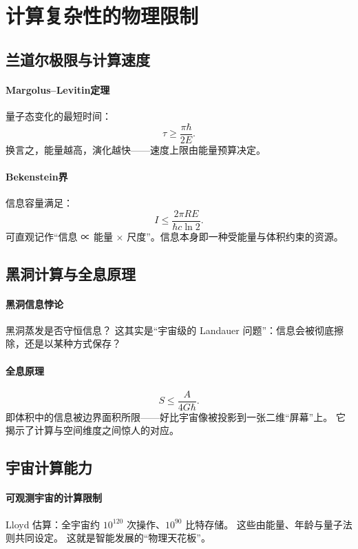 \section{计算复杂性的物理限制}

\subsection{兰道尔极限与计算速度}

\paragraph{Margolus–Levitin定理}
量子态变化的最短时间：
$$\tau\ge\dfrac{\pi\hbar}{2E}.$$
换言之，能量越高，演化越快——速度上限由能量预算决定。

\paragraph{Bekenstein界}
信息容量满足：
$$I\le\dfrac{2\pi RE}{\hbar c\ln2}.$$
可直观记作“信息 ∝ 能量 × 尺度”。信息本身即一种受能量与体积约束的资源。

\subsection{黑洞计算与全息原理}

\paragraph{黑洞信息悖论}
黑洞蒸发是否守恒信息？  
这其实是“宇宙级的 Landauer 问题”：信息会被彻底擦除，还是以某种方式保存？

\paragraph{全息原理}
$$S\le\dfrac{A}{4G\hbar}.$$
即体积中的信息被边界面积所限——好比宇宙像被投影到一张二维“屏幕”上。  
它揭示了计算与空间维度之间惊人的对应。

\subsection{宇宙计算能力}

\paragraph{可观测宇宙的计算限制}
Lloyd 估算：全宇宙约 $10^{120}$ 次操作、$10^{90}$ 比特存储。  
这些由能量、年龄与量子法则共同设定。  
这就是智能发展的“物理天花板”。

